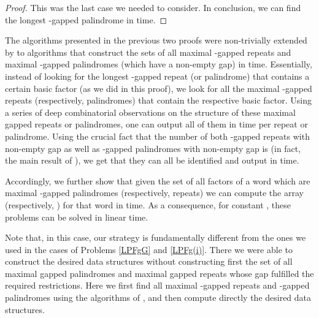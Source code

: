 \documentclass[final]{dmtcs-episciences}
\begin{document}
\begin{proof}
This was the last case we needed to consider. In conclusion, we can find the longest -gapped palindrome  in  time.
\end{proof}

The algorithms presented in the previous two proofs were non-trivially extended by \cite{STACS2016} to algorithms that construct the sets of all maximal -gapped repeats and maximal -gapped palindromes (which have a non-empty gap) in  time. Essentially, instead of looking for the longest -gapped repeat (or palindrome) that contains a certain basic factor (as we did in this proof), we look for all the maximal -gapped repeats (respectively, palindromes) that contain the respective basic factor. Using a series of deep combinatorial observations on the structure of these maximal gapped repeats or palindromes, one can output all of them in  time per repeat or palindrome. Using the crucial fact that the number of both -gapped repeats with non-empty gap as well as -gapped palindromes with non-empty gap is  (in fact, the main result of \cite{STACS2016}), we get that they can all be identified and output in  time.

Accordingly, we further show that given the set  of all factors of a word which are maximal -gapped palindromes (respectively, repeats) we can compute the array  (respectively, ) for that word in  time. As a consequence, for constant , these problems can be solved in linear time. 

Note that, in this case, our strategy is fundamentally different from the ones we used in the cases of Problems \ref{LPFgG} and \ref{LPFg(i)}. There we were able to construct the desired data structures without constructing first the set of all maximal gapped palindromes and maximal gapped repeats whose gap fulfilled the required restrictions. Here we first find all maximal -gapped repeats and -gapped palindromes using the algorithms of \cite{STACS2016}, and then compute directly the desired data structures. 
\end{document}

